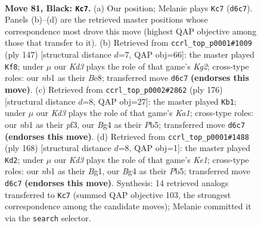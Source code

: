 \documentclass[11pt]{article}
\begin{document}
\clearpage

\begin{figure}[p]\centering
\begin{subfigure}{0.46\textwidth}\centering
\resizebox{\linewidth}{!}{%
\newchessgame
\chessboard[
  setfen={5B2/8/3k4/8/p1p3b1/8/5K2/1N6 b - - 17 81},
  showmover=false,
  pgfstyle=straightmove, color=movearrow, markmove={d6-c7}
]}
\caption{}
\end{subfigure}\hfill
\begin{subfigure}{0.46\textwidth}\centering
\resizebox{\linewidth}{!}{%
\newchessgame
\chessboard[
  setfen={4b3/6k1/4P3/4B1p1/8/8/5K2/8 b - - 4 74},
  showmover=false,
  pgfstyle=straightmove, color=movearrow, markmove={g7-f8}
]}
\caption{}
\end{subfigure}
\\[4pt]
\begin{subfigure}{0.46\textwidth}\centering
\resizebox{\linewidth}{!}{%
\newchessgame
\chessboard[
  setfen={8/1B6/3k1b2/1P6/8/5p2/8/K7 w - - 4 89},
  showmover=false,
  pgfstyle=straightmove, color=movearrow, markmove={a1-b1}
]}
\caption{}
\end{subfigure}\hfill
\begin{subfigure}{0.46\textwidth}\centering
\resizebox{\linewidth}{!}{%
\newchessgame
\chessboard[
  setfen={8/8/3k4/1P5b/5p2/8/8/4K1B1 w - - 8 85},
  showmover=false,
  pgfstyle=straightmove, color=movearrow, markmove={e1-d2}
]}
\caption{}
\end{subfigure}
\caption{\textbf{Move 81, Black: \texttt{Kc7}.} (a) Our position; Melanie plays \texttt{Kc7} (\texttt{d6c7}). Panels (b)--(d) are the retrieved master positions whose correspondence most drove this move (highest QAP objective among those that transfer to it). (b) Retrieved from \texttt{ccrl\_top\_p0001\#1009} (ply 147) [structural distance $d$=7, QAP obj=66]: the master played \texttt{Kf8}; under $\mu$ our \emph{Kd3} plays the role of that game's \emph{Kg2}; cross-type roles: our \emph{n}b1 as their \emph{B}e8; transferred move \texttt{d6c7} \textbf{(endorses this move)}. (c) Retrieved from \texttt{ccrl\_top\_p0002\#2862} (ply 176) [structural distance $d$=8, QAP obj=27]: the master played \texttt{Kb1}; under $\mu$ our \emph{Kd3} plays the role of that game's \emph{Ka1}; cross-type roles: our \emph{n}b1 as their \emph{p}f3, our \emph{B}g4 as their \emph{P}b5; transferred move \texttt{d6c7} \textbf{(endorses this move)}. (d) Retrieved from \texttt{ccrl\_top\_p0001\#1488} (ply 168) [structural distance $d$=8, QAP obj=1]: the master played \texttt{Kd2}; under $\mu$ our \emph{Kd3} plays the role of that game's \emph{Ke1}; cross-type roles: our \emph{n}b1 as their \emph{B}g1, our \emph{B}g4 as their \emph{P}b5; transferred move \texttt{d6c7} \textbf{(endorses this move)}. Synthesis: 14 retrieved analogs transferred to \texttt{Kc7} (summed QAP objective 103, the strongest correspondence among the candidate moves); Melanie committed it via the \texttt{search} selector.}
\label{fig:thought-m161}
\end{figure}
\end{document}
